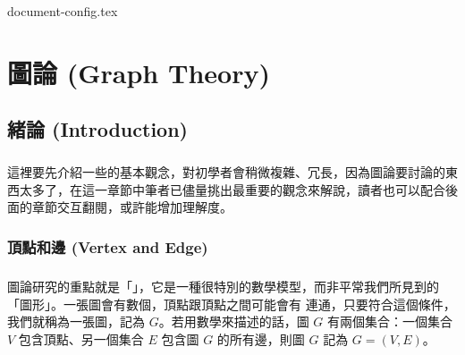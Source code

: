\documentclass[12pt,a4paper,oneside]{report}
\begin{document}
\begin{CJK}{UTF8}{bkai}

{document-config.tex}
\setcounter{chapter}{8}

\fi

\providecommand*{\UEdge}[2]{\ensuremath{({#1},{#2})}}
\providecommand*{\DEdge}[2]{\ensuremath{\langle{}{{#1},{#2}}\rangle{}}}
\providecommand*{\Deg}[2][G]{\ensuremath{d_{#1}{(#2)}}}
\providecommand*{\OutDeg}[2][G]{\ensuremath{d^{+}_{#1}{(#2)}}}
\providecommand*{\InDeg}[2][G]{\ensuremath{d^{-}_{#1}{(#2)}}}

\label{tag:def_constant}
\newcommand*{\SelectedVertexStyle}{%
   \SetVertexNormal[
     MinSize=24pt,%
     LineWidth=1.5pt,%
     FillColor=black!20]}

\chapter{圖論 (Graph Theory)}
\section{緒論 (Introduction)}
\paragraph{}這裡要先介紹一些的基本觀念，對初學者會稍微複雜、冗長，因為圖論要討論的東西太多了，在這一章節中筆者已儘量挑出最重要的觀念來解說，讀者也可以配合後面的章節交互翻閱，或許能增加理解度。

\subsection{頂點和邊 (Vertex and Edge)}
\paragraph{}圖論研究的重點就是「\textbf{}」，它是一種很特別的數學模型，而非平常我們所見到的「圖形」。一張圖會有數個\textbf{}，頂點跟頂點之間可能會有\textbf{} 連通，只要符合這個條件，我們就稱為一張圖，記為 $G$。若用數學來描述的話，圖 $G$ 有兩個集合：一個集合 $V$ 包含頂點、另一個集合 $E$ 包含圖 $G$ 的所有邊，則圖 $G$ 記為 $G=(V,E)$。

\end{CJK}
\end{document}
